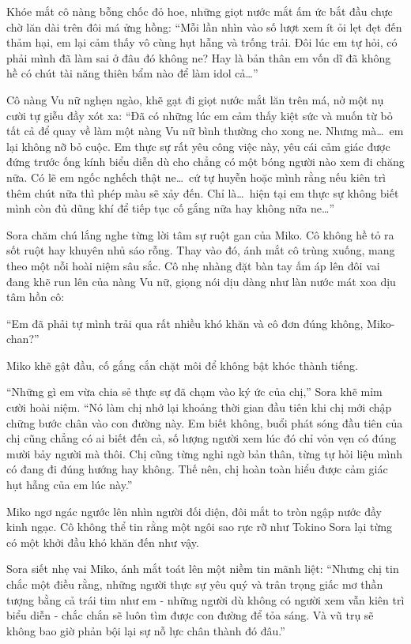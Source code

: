 \documentclass[../main.tex]{subfiles}
\begin{document}
Khóe mắt cô nàng bỗng chốc đỏ hoe, những giọt nước mắt ấm ức bắt đầu chực chờ lăn dài trên đôi má ửng hồng: ``Mỗi lần nhìn vào số lượt xem ít ỏi lẹt đẹt đến thảm hại, em lại cảm thấy vô cùng hụt hẫng và trống trải. Đôi lúc em tự hỏi, có phải mình đã làm sai ở đâu đó không ne? Hay là bản thân em vốn dĩ đã không hề có chút tài năng thiên bẩm nào để làm idol cả\dots''

Cô nàng Vu nữ nghẹn ngào, khẽ gạt đi giọt nước mắt lăn trên má, nở một nụ cười tự giễu đầy xót xa: ``Đã có những lúc em cảm thấy kiệt sức và muốn từ bỏ tất cả để quay về làm một nàng Vu nữ bình thường cho xong ne. Nhưng mà\dots\ em lại không nỡ bỏ cuộc. Em thực sự rất yêu công việc này, yêu cái cảm giác được đứng trước ống kính biểu diễn dù cho chẳng có một bóng người nào xem đi chăng nữa. Có lẽ em ngốc nghếch thật ne\dots\ cứ tự huyễn hoặc mình rằng nếu kiên trì thêm chút nữa thì phép màu sẽ xảy đến. Chỉ là\dots\ hiện tại em thực sự không biết mình còn đủ dũng khí để tiếp tục cố gắng nữa hay không nữa ne\dots''

Sora chăm chú lắng nghe từng lời tâm sự ruột gan của Miko. Cô không hề tỏ ra sốt ruột hay khuyên nhủ sáo rỗng. Thay vào đó, ánh mắt cô trùng xuống, mang theo một nỗi hoài niệm sâu sắc. Cô nhẹ nhàng đặt bàn tay ấm áp lên đôi vai đang khẽ run lên của nàng Vu nữ, giọng nói dịu dàng như làn nước mát xoa dịu tâm hồn cô:

``Em đã phải tự mình trải qua rất nhiều khó khăn và cô đơn đúng không, Miko-chan?''

Miko khẽ gật đầu, cố gắng cắn chặt môi để không bật khóc thành tiếng.

``Những gì em vừa chia sẻ thực sự đã chạm vào ký ức của chị,'' Sora khẽ mỉm cười hoài niệm. ``Nó làm chị nhớ lại khoảng thời gian đầu tiên khi chị mới chập chững bước chân vào con đường này. Em biết không, buổi phát sóng đầu tiên của chị cũng chẳng có ai biết đến cả, số lượng người xem lúc đó chỉ vỏn vẹn có đúng mười bảy người mà thôi. Chị cũng từng nghi ngờ bản thân, từng tự hỏi liệu mình có đang đi đúng hướng hay không. Thế nên, chị hoàn toàn hiểu được cảm giác hụt hẫng của em lúc này.''

Miko ngơ ngác ngước lên nhìn người đối diện, đôi mắt to tròn ngập nước đầy kinh ngạc. Cô không thể tin rằng một ngôi sao rực rỡ như Tokino Sora lại từng có một khởi đầu khó khăn đến như vậy.

Sora siết nhẹ vai Miko, ánh mắt toát lên một niềm tin mãnh liệt: ``Nhưng chị tin chắc một điều rằng, những người thực sự yêu quý và trân trọng giấc mơ thần tượng bằng cả trái tim như em - những người dù không có người xem vẫn kiên trì biểu diễn - chắc chắn sẽ luôn tìm được con đường để tỏa sáng. Và vũ trụ sẽ không bao giờ phản bội lại sự nỗ lực chân thành đó đâu.''
\end{document}
